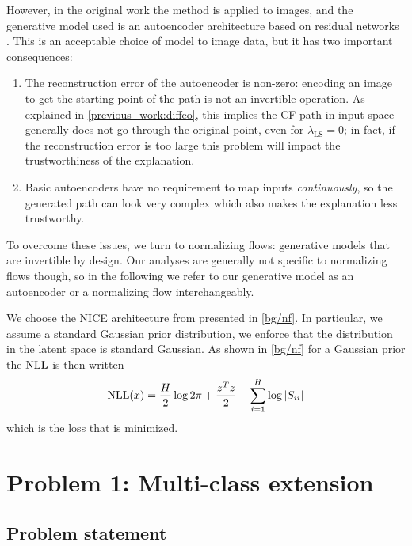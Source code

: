 \documentclass[../main.tex]{subfiles}
\begin{document}
However, in the original \ls{} work the method is applied to images, and the generative model used is an autoencoder architecture based on residual networks \cite{heDeep2015}.
This is an acceptable choice of model to image data, but it has two important consequences:
\begin{enumerate}
	\item The reconstruction error of the autoencoder is non-zero: encoding an image to get the starting point of the path is not an invertible operation.
	      As explained in \autoref{previous_work:diffeo}, this implies the CF path in input space generally does not go through the original point, even for $\lambda_\text{LS} = 0$; in fact, if the reconstruction error is too large this problem will impact the trustworthiness of the explanation.

	\item Basic autoencoders have no requirement to map inputs \emph{continuously}, so the generated path can look very complex which also makes the explanation less trustworthy.
\end{enumerate}

To overcome these issues, we turn to normalizing flows: generative models that are invertible by design.
Our analyses are generally not specific to normalizing flows though, so in the following we refer to our generative model as an autoencoder or a normalizing flow interchangeably.

We choose the NICE architecture from \cite{dinhNICE2015} presented in \autoref{bg/nf}.
In particular, we assume a standard Gaussian prior distribution, \ie{} we enforce that the distribution in the latent space is standard Gaussian.
As shown in \autoref{bg/nf} for a Gaussian prior the $\text{NLL}$ is then written
\begin{align*}
\text{NLL}(x) = \frac{H}{2} \log 2 \pi
    +  \frac{z^T z}{2}
    - \sum_{i=1}^H \log \left\lvert S_{ii}\right\rvert
\end{align*}
which is the loss that is minimized.


\section{Problem 1: Multi-class extension}

\subsection{Problem statement}
\end{document}
